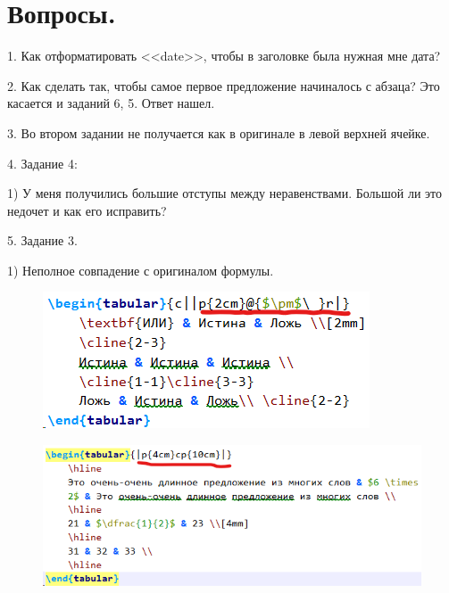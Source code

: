 \documentclass[a4paper,12pt]{article} %
\begin{document}
	\newpage
	\section{Вопросы.}
	1. Как отформатировать <<date>>, чтобы в заголовке была нужная мне дата?
	
	2. Как сделать так, чтобы самое первое предложение начиналось с абзаца? Это касается и заданий 6, 5. Ответ нашел.
	
	3. Во втором задании не получается как в оригинале в левой верхней ячейке.
	
	4. Задание 4:
	
		1) У меня получились большие отступы между неравенствами. Большой ли это недочет и как его исправить?
	
	5. Задание 3. 
	
		1) Неполное совпадение с оригиналом формулы.
		\begin{figure}
			\centering
			\includegraphics[width=0.7\linewidth]{screenshot001}
			\caption{}
			\label{fig:screenshot001}
		\end{figure}
		\begin{figure}
			\centering
			\includegraphics[width=0.7\linewidth]{screenshot002}
			\caption{}
			\label{fig:screenshot002}
		\end{figure}
		
	
\end{document}
